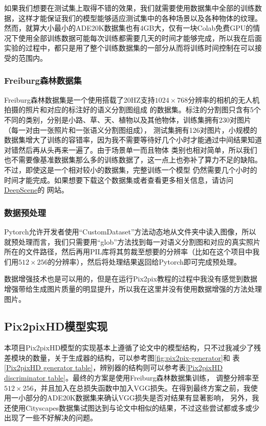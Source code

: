 \documentclass[supercite]{HustGraduPaper}
\theoremstyle{definition}
\begin{document}
如果我们想要在测试集上取得不错的效果，我们就需要使用数据集中全部的训练数据，这样才能保证我们的模型能够适应测试集中的各种场景以及各种物体的纹理。
然而，就算大小最小的ADE20K数据集也有4GB大，仅有一块Colab免费GPU的情况下使用全部训练数据可能每次训练都需要几天的时间才能够完成，所以我在后面
实验的过程中，都只是用了整个训练数据集的一部分从而将训练时间控制在可以接受的范围内。

\subsubsection{Freiburg森林数据集}
\label{sec:forest}

Freiburg森林数据集\cite{valada16iser}是一个使用搭载了20HZ支持$1024\times768$分辨率的相机的无人机拍摄的照片和对应的标注好的语义分割图组成
的数据集。标注的分割图只含有5个不同的类别，分别是小路、草、天、植物以及其他物体，训练集拥有230对图片（每一对由一张照片和一张语义分割图组成），
测试集拥有126对图片，小规模的数据集增大了训练的容错率，因为我不需要等待好几个小时才能通过中间结果知道对错然后再从头再来一遍了。由于场景单一而且物体
类别也相对简单，所以我们也不需要像基准数据集那么多的训练数据了，这一点上也弥补了算力不足的缺陷。不过，即使这是一个相对较小的数据集，完整训练一个模型
仍然需要几个小时的时间才能完成。如果想要下载这个数据集或者查看更多相关信息，请访问\href{http://deepscene.cs.uni-freiburg.de}{DeepScene}的
网站。

\subsubsection{数据预处理}

Pytorch允许开发者使用“CustomDataset”方法动态地从文件夹中读入图像，所以就预处理而言，我们只需要用“glob”方法找到每一对语义分割图和对应的真实照片
所在的文件路径，然后再用PIL库将其剪裁至想要的分辨率（比如在这个项目中我们用$512\times256$的分辨率），然后将处理结果返回给Pytorch即可完成预处理。

数据增强技术也是可以用的，但是在运行Pix2pix教程的过程中我没有感觉到数据增强带给生成图片质量的明显提升，所以我在这里并没有使用数据增强的方法处理图片。

\subsection{Pix2pixHD模型实现}

本项目Pix2pixHD模型的实现基本上遵循了论文中的模型结构，只不过我减少了残差模块的数量，关于生成器的结构，可以参考图\ref{fig:pix2pix-generator}和
表\ref{Pix2pixHD generator table}，辨别器的结构则可以参考表\ref{Pix2pixHD discriminator table}。最终的方案是使用Freiburg森林数据集训练，
调整分辨率至$512\times256$，并且加入在总损失函数中加入VGG损失。在得到最终方案之前，我使用一小部分的ADE20K数据集来确认VGG损失是否对结果有显著影响，
另外，我还使用Cityscapes数据集试图达到与论文中相似的结果，不过这些尝试都或多或少出现了一些不好解决的问题。
\end{document}

